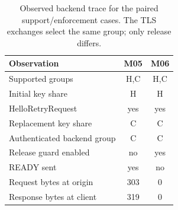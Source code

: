 \begin{table}[t]\centering\small
\caption{Observed backend trace for the paired support/enforcement cases. The TLS exchanges select the same group; only release differs.}
\label{tab:paired}
\begin{tabular}{@{}p{}cc@{}}\toprule
Observation & M05 & M06 \\ \midrule
Supported groups & H,C & H,C \\
Initial key share & H & H \\
HelloRetryRequest & yes & yes \\
Replacement key share & C & C \\
Authenticated backend group & C & C \\
Release guard enabled & no & yes \\
READY sent & yes & no \\
Request bytes at origin & 303 & 0 \\
Response bytes at client & 319 & 0 \\
\bottomrule\end{tabular}
\end{table}

